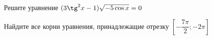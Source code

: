 \begin{ex}
	\begin{condition}
		\begin{enumcols}[label=\asbuk*)]
			\item Решите уравнение \( (3\tg^2 x  - 1)\sqrt{-5\cos x} = 0 \)
			\item Найдите все корни уравнения, принадлежащие отрезку \( \left[-\dfrac{7\pi}{2};-2\pi\right] \)
		\end{enumcols}
	\end{condition}
\end{ex}